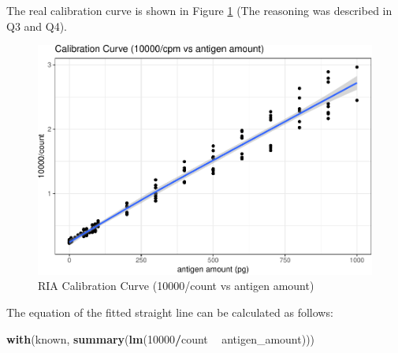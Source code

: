\documentclass[
]{article}
\newenvironment{Shaded}{\begin{snugshade}}{\end{snugshade}}
\newcommand{\DataTypeTok}[1]{\textcolor[rgb]{0.13,0.29,0.53}{#1}}
\newcommand{\DecValTok}[1]{\textcolor[rgb]{0.00,0.00,0.81}{#1}}
\newcommand{\FloatTok}[1]{\textcolor[rgb]{0.00,0.00,0.81}{#1}}
\newcommand{\KeywordTok}[1]{\textcolor[rgb]{0.13,0.29,0.53}{\textbf{#1}}}
\newcommand{\NormalTok}[1]{#1}
\newcommand{\OperatorTok}[1]{\textcolor[rgb]{0.81,0.36,0.00}{\textbf{#1}}}
\newcommand{\StringTok}[1]{\textcolor[rgb]{0.31,0.60,0.02}{#1}}
\begin{document}
The real calibration curve is shown in Figure \ref{fig:ria-cali} (The reasoning was described in Q3 and Q4).

\begin{Shaded}
\end{Shaded}

\begin{figure}
\centering
\includegraphics{2020-03-08-immunoassay-in-silico_files/figure-latex/ria-cali-1.pdf}
\caption{\label{fig:ria-cali}RIA Calibration Curve (10000/count vs antigen amount)}
\end{figure}

The equation of the fitted straight line can be calculated as follows:

\begin{Shaded}
\begin{Highlighting}[]
\KeywordTok{with}\NormalTok{(known, }\KeywordTok{summary}\NormalTok{(}\KeywordTok{lm}\NormalTok{(}\DecValTok{10000}\OperatorTok{/}\NormalTok{count }\OperatorTok{~}\StringTok{ }\NormalTok{antigen_amount)))}
\end{Highlighting}
\end{Shaded}
\end{document}
